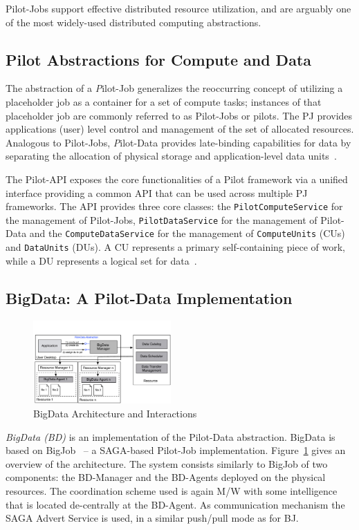 \documentclass{acm_proc_article-sp}
\newcommand{\pilot}{Pilot\xspace}
\newcommand{\pilotjob}{Pilot-Job\xspace}
\newcommand{\pilotjobs}{Pilot-Jobs\xspace}
\begin{document}
Pilot-Jobs support effective distributed resource utilization, and are arguably one of the most widely-used distributed computing abstractions. 

\subsection{Pilot Abstractions for Compute and Data}

The abstraction of a {\emph \pilotjob} generalizes the reoccurring concept of
utilizing a placeholder job as a container for a set of compute tasks;
instances of that placeholder job are commonly referred to as Pilot-Jobs or
pilots. The PJ provides applications (user) level control and management of
the set of allocated resources. Analogous to \pilotjobs, {\emph Pilot-Data}
provides late-binding capabilities for data by separating the allocation of
physical storage and application-level data units~\cite{pstar-2012}.

The Pilot-API exposes the core functionalities of a \pilot framework via a
unified interface providing a common API that can be used across multiple PJ
frameworks. The API provides three core classes: the
\texttt{PilotComputeService} for the management of Pilot-Jobs,
\texttt{PilotDataService} for the management of Pilot-Data and the
\texttt{ComputeDataService} for the management of \texttt{ComputeUnits} (CUs)
and \texttt{DataUnits} (DUs). A CU represents a primary self-containing piece
of work, while a DU represents a logical set for data~\cite{pstar-2012}.

\subsection{BigData: A Pilot-Data Implementation}
\begin{figure}[htbp]
	\centering
		\includegraphics[width=0.47\textwidth]{figures/bigdata.pdf}
	\caption{BigData Architecture and Interactions}
	\label{fig:figures_bigdata}
\end{figure}

{\it BigData (BD)} is an implementation of the Pilot-Data abstraction.
BigData is based on BigJob~\cite{bigjob_web} -- a SAGA-based Pilot-Job
implementation. Figure~\ref{fig:figures_bigdata} gives an overview of the
architecture. The system consists similarly to BigJob of two components: the
BD-Manager and the BD-Agents deployed on the physical resources. The
coordination scheme used is again M/W with some intelligence that is located
de-centrally at the BD-Agent. As communication mechanism the SAGA Advert
Service is used, in a similar push/pull mode as for BJ.
\end{document}
